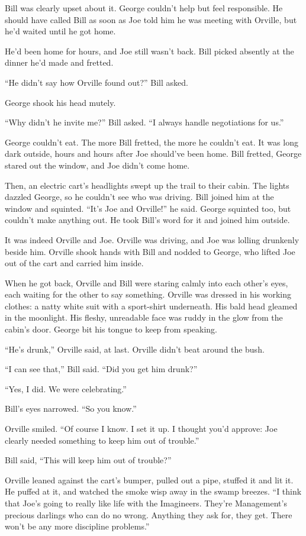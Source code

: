 Bill was clearly upset about it. George couldn't help but feel
responsible. He should have called Bill as soon as Joe told him he
was meeting with Orville, but he'd waited until he got home.

He'd been home for hours, and Joe still wasn't back. Bill picked
absently at the dinner he'd made and fretted.

``He didn't say how Orville found out?'' Bill asked.

George shook his head mutely.

``Why didn't he invite me?'' Bill asked.
``I always handle negotiations for us.''

George couldn't eat. The more Bill fretted, the more he couldn't
eat. It was long dark outside, hours and hours after Joe should've
been home. Bill fretted, George stared out the window, and Joe
didn't come home.

Then, an electric cart's headlights swept up the trail to their
cabin. The lights dazzled George, so he couldn't see who was
driving. Bill joined him at the window and squinted.
``It's Joe and Orville!'' he said. George squinted too, but
couldn't make anything out. He took Bill's word for it and joined
him outside.

It was indeed Orville and Joe. Orville was driving, and Joe was
lolling drunkenly beside him. Orville shook hands with Bill and
nodded to George, who lifted Joe out of the cart and carried him
inside.

When he got back, Orville and Bill were staring calmly into each
other's eyes, each waiting for the other to say something. Orville
was dressed in his working clothes: a natty white suit with a
sport-shirt underneath. His bald head gleamed in the moonlight. His
fleshy, unreadable face was ruddy in the glow from the cabin's
door. George bit his tongue to keep from speaking.

``He's drunk,'' Orville said, at last. Orville didn't beat around
the bush.

``I can see that,'' Bill said. ``Did you get him drunk?''

``Yes, I did. We were celebrating.''

Bill's eyes narrowed. ``So you know.''

Orville smiled.
``Of course I know. I set it up. I thought you'd approve: Joe clearly needed 
something to keep him out of trouble.''

Bill said, ``This will keep him out of trouble?''

Orville leaned against the cart's bumper, pulled out a pipe,
stuffed it and lit it. He puffed at it, and watched the smoke wisp
away in the swamp breezes.
``I think that Joe's going to really like life with the Imagineers. They're 
Management's precious darlings who can do no wrong. Anything they ask for, they 
get. There won't be any more discipline problems.''


